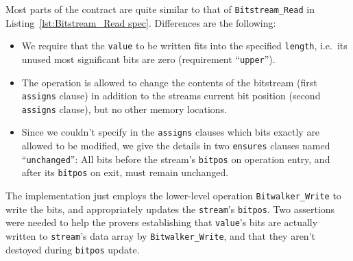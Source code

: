 Most parts of the contract are quite similar to that of \lstinline{Bitstream_Read} in
Listing~\ref{lst:Bitstream_Read spec}.
%
Differences are the following:
\begin{itemize}
\item We require that the \lstinline{value} to be written fits into the specified
	\lstinline{length}, i.e.\ its unused most significant bits are zero (requirement
	``\lstinline{upper}'').
\item The operation is allowed to change the contents of the bitstream 
	(first \lstinline{assigns} clause) in addition to the streams current bit
	position (second \lstinline{assigns} clause), but no other memory locations.
\item Since we couldn't specify in the \lstinline{assigns} clauses 
	which bits exactly are allowed to be modified, we give the details in two
	\lstinline{ensures} clauses named ``\lstinline{unchanged}'':
	All bits before the stream's \lstinline{bitpos} on operation entry, and after
	its \lstinline{bitpos} on exit, must remain unchanged.
\end{itemize}

The implementation just employs the lower-level operation \lstinline{Bitwalker_Write} to
write the bits, and appropriately updates the \lstinline{stream}'s \lstinline{bitpos}.
%
Two assertions were needed to help the provers establishing that \lstinline{value}'s
bits are actually written to \lstinline{stream}'s data array by
\lstinline{Bitwalker_Write}, and that they aren't destoyed during \lstinline{bitpos}
update.





